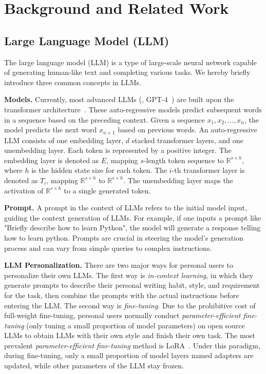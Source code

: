 \section{Background and Related Work}
\subsection{Large Language Model (LLM)}
The large language model (LLM) is a type of large-scale neural network capable of generating human-like text and completing various tasks. We hereby briefly introduce three common concepts  in LLMs.


\noindent \textbf{Models.} Currently, most advanced LLMs (\eg, GPT-4~\cite{gpt4}) are built upon the transformer architecture~\cite{vaswani2017attention}. These auto-regressive models predict subsequent words in a sequence based on the preceding context. Given a sequence $x_1, x_2, \ldots, x_n$, the model predicts the next word $x_{n+1}$ based on previous words. An auto-regressive LLM consists of one embedding layer, $d$ stacked transformer layers, and one unembedding layer. Each token is represented by a positive integer. The embedding layer is denoted as $E$, mapping $s$-length token sequence to  $\mathbb{R}^{s\times h}$, where $h$ is the hidden state size for each token.  The $i$-th transformer layer is denoted as $T_i$, mapping $\mathbb{R}^{s\times h}$ to $\mathbb{R}^{s\times h}$. The unembedding layer maps the activation of $\mathbb{R}^{s\times h}$ to a single generated token.



\noindent \textbf{Prompt.} A prompt in the context of LLMs refers to the initial model input, guiding the context generation of LLMs. For example, if one inputs a prompt like "Briefly describe how to learn Python", the model will generate a   response telling how to learn python. Prompts are crucial in steering the model's generation process and can vary from simple queries to complex instructions.


\noindent \textbf{LLM Personalization.} There are two major ways for personal users to personalize their own LLMs. The first way is \emph{in-context learning}, in which they generate prompts to describe their personal writing habit, style, and requirement for the task, 
then combine the prompts  with the actual instructions before entering the LLM. The second way is \emph{fine-tuning}. Due to the prohibitive cost of full-weight fine-tuning, personal users normally conduct \emph{parameter-efficient fine-tuning} (only tuning a small proportion of model parameters) on open source LLMs to obtain LLMs with their own style and finish their own task. The most prevalent \emph{parameter-efficient fine-tuning} method is LoRA~\cite{lora}. Under this paradigm, during fine-tuning, only a small proportion of model layers named adapters are updated, while other parameters of the LLM stay frozen.

